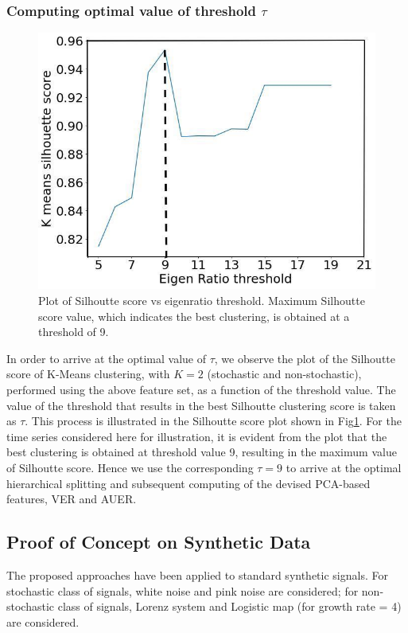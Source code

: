 \documentclass[journal]{IEEEtran}
\begin{document}
	\subsubsection{ Computing optimal value of threshold $\tau$} \label{compute_threshold}

		\begin{figure}[ht]
		\centering
		\includegraphics[width=0.8\linewidth]{threshold.jpg}
		\caption{Plot of Silhoutte score vs eigenratio threshold. Maximum Silhoutte score value, which indicates the best clustering, is obtained at a threshold of 9.}
		\label{sill}
	\end{figure}



	In order to arrive at the optimal value of $\tau$, we observe  the plot of the Silhoutte score of K-Means clustering, with $K=2$ (stochastic and non-stochastic), performed using the above feature set, as a function of the threshold value. The value of the threshold that results in the best Silhoutte clustering score is taken as $\tau$. This process is illustrated in the Silhoutte score plot shown in Fig\ref{sill}. For the time series considered here for illustration, it is evident from the plot that the best clustering is obtained at threshold value 9, resulting in the maximum value of Silhoutte score. Hence we use the corresponding $\tau = 9$ to arrive at the optimal hierarchical splitting and subsequent computing of the devised PCA-based features, VER and AUER.

	\subsection{Proof of Concept on Synthetic Data}
	The proposed approaches have been applied to standard synthetic signals. For stochastic class of signals, white noise and pink noise are considered; for non-stochastic class of signals, Lorenz system and Logistic map (for growth rate = 4) are considered.
	
\end{document}
